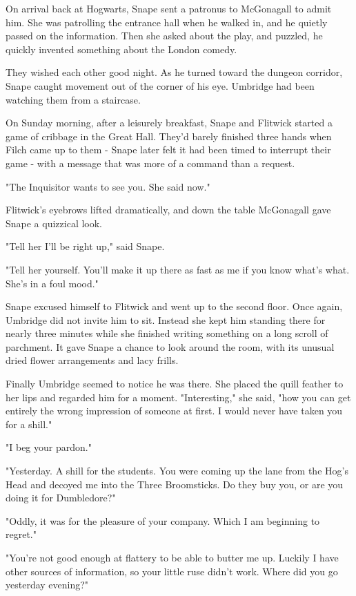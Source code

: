 \documentclass[a4paper,11pt]{article}
\begin{document}
On arrival back at Hogwarts, Snape sent a patronus to McGonagall to admit him. She was patrolling the entrance hall when he walked in, and he quietly passed on the information. Then she asked about the play, and puzzled, he quickly invented something about the London comedy.

They wished each other good night. As he turned toward the dungeon corridor, Snape caught movement out of the corner of his eye. Umbridge had been watching them from a staircase.

On Sunday morning, after a leisurely breakfast, Snape and Flitwick started a game of cribbage in the Great Hall. They'd barely finished three hands when Filch came up to them - Snape later felt it had been timed to interrupt their game - with a message that was more of a command than a request.

"The Inquisitor wants to see you. She said now."

Flitwick's eyebrows lifted dramatically, and down the table McGonagall gave Snape a quizzical look.

"Tell her I'll be right up," said Snape.

"Tell her yourself. You'll make it up there as fast as me if you know what's what. She's in a foul mood."

Snape excused himself to Flitwick and went up to the second floor. Once again, Umbridge did not invite him to sit. Instead she kept him standing there for nearly three minutes while she finished writing something on a long scroll of parchment. It gave Snape a chance to look around the room, with its unusual dried flower arrangements and lacy frills.

Finally Umbridge seemed to notice he was there. She placed the quill feather to her lips and regarded him for a moment. "Interesting," she said, "how you can get entirely the wrong impression of someone at first. I would never have taken you for a shill."

"I beg your pardon."

"Yesterday. A shill for the students. You were coming up the lane from the Hog's Head and decoyed me into the Three Broomsticks. Do they buy you, or are you doing it for Dumbledore?"

"Oddly, it was for the pleasure of your company. Which I am beginning to regret."

"You're not good enough at flattery to be able to butter me up. Luckily I have other sources of information, so your little ruse didn't work. Where did you go yesterday evening?"
\end{document}
